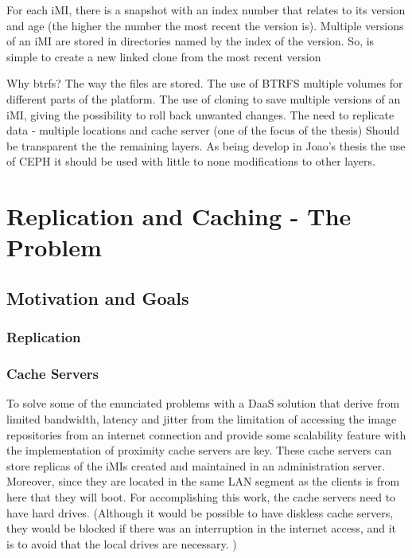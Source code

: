 For each iMI, there is a snapshot with an index number that relates to its version and age (the higher the number the most recent the version is).
Multiple versions of an iMI are stored in directories named by the index of the version. So, is simple to create a new linked clone from the most recent version 

Why btrfs?
The way the files are stored.
The use of BTRFS multiple volumes for different parts of the platform.
The use of cloning to save multiple versions of an iMI, giving the possibility to roll back unwanted changes.
The need to replicate data - multiple locations and cache server (one of the focus of the thesis)
Should be transparent the the remaining layers. As being develop in Joao's thesis the use of CEPH it should be used with little to none modifications to other layers.


\section{Replication and Caching - The Problem}
\label{sec:replication_cache}


\subsection{Motivation and Goals}
\label{sub:motivation_goals}

\subsubsection{Replication}

\subsubsection{Cache Servers}

To solve some of the enunciated problems with a DaaS solution that derive from limited bandwidth, latency and jitter from the limitation of accessing the image repositories from an internet connection and provide some scalability feature with the implementation of proximity cache servers are key. These cache servers can store replicas of the iMIs created and maintained in an administration server. Moreover, since they are located in the same LAN segment as the clients is from here that they will boot.
For accomplishing this work, the cache servers need to have hard drives. (Although it would be possible to have diskless cache servers, they would be blocked if there was an interruption in the internet access, and it is to avoid that the local drives are necessary. )

